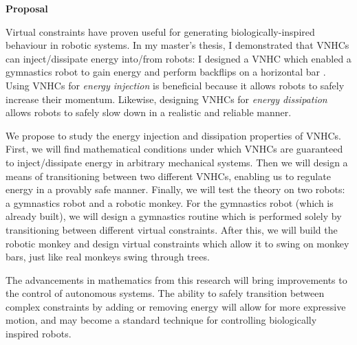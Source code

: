 \documentclass[a4paper,12pt]{article}
\begin{document}
\begin{large} \textbf{Proposal} \end{large}

Virtual constraints have proven useful for generating biologically-inspired
behaviour in robotic systems.
In my master's thesis, I demonstrated that VNHCs can inject/dissipate energy
into/from robots:
I designed a VNHC which enabled a gymnastics robot to gain energy
and perform backflips on a horizontal bar \cite{my-thesis}.
Using VNHCs for \textit{energy injection} is beneficial because it allows robots to
safely increase their momentum.
Likewise, designing VNHCs for \textit{energy dissipation} allows robots to
safely slow down in a realistic and reliable manner. 

We propose to study the energy injection and dissipation properties of VNHCs.
First, we will find mathematical conditions under which VNHCs are guaranteed to
inject/dissipate energy in arbitrary mechanical systems.
Then we will design a means of transitioning between two different VNHCs,
enabling us to regulate energy in a provably safe manner.
Finally, we will test the theory on two robots: a gymnastics robot and a robotic
monkey.
For the gymnastics robot (which is already built), we will design a gymnastics
routine which is performed solely by transitioning between different virtual
constraints.
After this, we will build the robotic monkey and design virtual constraints
which allow it to swing on monkey bars, just like real monkeys swing through
trees.

The advancements in mathematics from this research will bring improvements to
the control of autonomous systems. 
The ability to safely transition between complex constraints by adding or
removing energy will allow for more expressive motion, and may become a standard
technique for controlling biologically inspired robots.

\printbibliography
\end{document}
